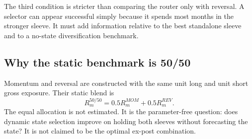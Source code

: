 The third condition is stricter than comparing the router only with reversal. A selector
can appear successful simply because it spends most months in the stronger sleeve. It
must add information relative to the best standalone sleeve and to a no-state
diversification benchmark.

\subsection{Why the static benchmark is 50/50}

Momentum and reversal are constructed with the same unit long and unit short gross
exposure. Their static blend is
\begin{equation}
  R^{50/50}_{m}=0.5R^{MOM}_{m}+0.5R^{REV}_{m}.
\end{equation}
The equal allocation is not estimated. It is the parameter-free question: does dynamic
state selection improve on holding both sleeves without forecasting the state? It is not
claimed to be the optimal ex-post combination.
